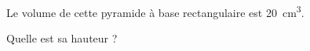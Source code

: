 
\begin{mental}

    Le volume de cette pyramide à base rectangulaire est \SI{20}{\centi\meter\cubed}.
    
\begin{center}
   
\end{center}

Quelle est sa hauteur ?

\end{mental}
